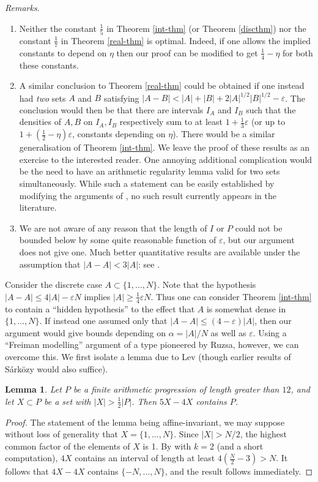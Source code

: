 \documentclass[10pt,reqno]{amsart}
\newtheorem{lemma}[theorem]{Lemma}
\theoremstyle{definition}
\theoremstyle{remark}
\renewcommand{\leq}{\leqslant}
\renewcommand{\geq}{\geqslant}
\def\eps{\varepsilon}
\numberwithin{equation}{section}
\begin{document}
\emph{Remarks.}
\begin{enumerate}
	\item Neither the constant $\tfrac{1}{5}$ in Theorem \ref{int-thm} (or Theorem \ref{discthm}) nor the constant $\tfrac{1}{7}$ in Theorem \ref{real-thm} is optimal. Indeed, if one allows the implied constants to depend on $\eta$ then our proof can be modified to get $\tfrac{1}{4}-\eta$ for both these constants.
	\item A similar conclusion to Theorem \ref{real-thm} could be obtained if one instead had \emph{two} sets $A$ and $B$ satisfying $|A - B| < |A| + |B| + 2|A|^{1/2} |B|^{1/2} - \eps$. The conclusion would then be that there are intervals $I_A$ and $I_B$ such that the densities of $A, B$ on $I_A, I_B$ respectively sum to at least $1 + \tfrac{1}{3}\eps$ (or up to $1 + (\tfrac{1}{2}-\eta)\eps$, constants depending on $\eta$). There would be a similar generalisation of Theorem \ref{int-thm}. We leave the proof of these results as an exercise to the interested reader. One annoying additional complication would be the need to have an arithmetic regularity lemma valid for two sets simultaneously. While such a statement can be easily established by modifying the arguments of \cite{green-tao-arithregularity}, no such result currently appears in the literature.
	\item We are not aware of any reason that the length of $I$ or $P$ could not be bounded below by some quite reasonable function of $\eps$, but our argument does not give one. Much better quantitative results are available under the assumption that $|A - A| < 3|A|$: see \cite{ruzsa-measure}.
\end{enumerate}

Consider the discrete case $A\subset \{1,\dots,N\}$. Note that the hypothesis $|A-A|\leq 4|A| - \eps N$ implies $|A|\geq \tfrac{1}{4}\eps N$. Thus one can consider Theorem \ref{int-thm} to contain a ``hidden hypothesis'' to the effect that $A$ is somewhat dense in $\{1,\dots,N\}$. If instead one assumed only that $|A-A|\leq (4-\eps)|A|$, then our argument would give bounds depending on $\alpha = |A|/N$ as well as $\eps$. Using a ``Freiman modelling'' argument of a type pioneered by Ruzsa, however, we can overcome this. We first isolate a lemma due to Lev \cite{lev} (though earlier results of S\'ark\"ozy \cite{sarkozy} would also suffice). 

\begin{lemma}
Let $P$ be a finite arithmetic progression of length greater than $12$, and let $X \subset P$ be a set with $|X| > \frac{1}{2}|P|$. Then $5X - 4X$ contains $P$. 
\end{lemma}
\begin{proof}
The statement of the lemma being affine-invariant, we may suppose without loss of generality that $X = \{1,\dots,N\}$. Since $|X| > N/2$, the highest common factor of the elements of $X$ is 1. By \cite[Lemma 1]{lev} with $k = 2$ (and a short computation), $4X$ contains an interval of length at least $4(\frac{N}{2} - 3) > N$. It follows that $4X - 4X$ contains $\{-N,\dots,N\}$, and the result follows immediately.\end{proof}
\end{document}
